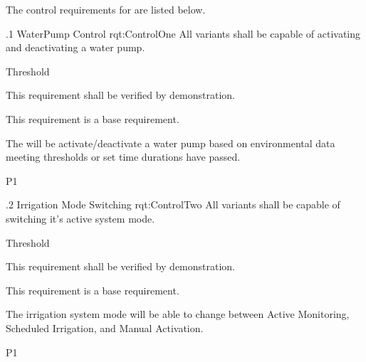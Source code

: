 The control requirements for \ThisSystem are listed below.

\ONERQMTVKPP
{\RqtNumberBase.1}
{WaterPump Control}
{rqt:ControlOne}
{All \ThisSys variants shall be capable of activating and deactivating a water pump.}
{
	\item [All Phases] Threshold
}
{This requirement shall be verified by demonstration.}
{
	\item [N/A] This requirement is a base requirement.
}
{
  \item The \ThisSystem will be activate/deactivate a water pump based on environmental data meeting thresholds or set time durations have passed.
}
{P1}

\ONERQMTVKPP
{\RqtNumberBase.2}
{Irrigation Mode Switching}
{rqt:ControlTwo}
{All \ThisSys variants shall be capable of switching it's active system mode.}
{
	\item [All Phases] Threshold
}
{This requirement shall be verified by demonstration.}
{
	\item [N/A] This requirement is a base requirement.
}
{
  \item The irrigation system mode will be able to change between Active Monitoring, Scheduled Irrigation, and Manual Activation.
}
{P1}
